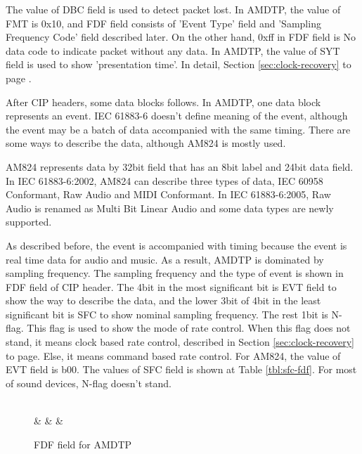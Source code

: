\documentclass[onecolumn]{article}
\begin{document}
The value of DBC field is used to detect packet lost. In AMDTP, the value of FMT is 0x10, and FDF field consists of 'Event Type' field and 'Sampling Frequency Code' field described later. On the other hand, 0xff in FDF field is No data code to indicate packet without any data. In AMDTP, the value of SYT field is used to show 'presentation time'. In detail, Section \ref{sec:clock-recovery} to page \pageref{sec:clock-recovery}.

After CIP headers, some data blocks follows. In AMDTP, one data block represents an event. IEC 61883-6\cite{iec61883-6-1, iec61883-6-2} doesn't define meaning of the event, although the event may be a batch of data accompanied with the same timing. There are some ways to describe the data, although AM824 is mostly used.

AM824 represents data by 32bit field that has an 8bit label and 24bit data field\cite{iec61883-6-2}. In IEC 61883-6:2002\cite{iec61883-6-1}, AM824 can describe three types of data, IEC 60958 Conformant, Raw Audio and MIDI Conformant. In IEC 61883-6:2005\cite{iec61883-6-2}, Raw Audio is renamed as Multi Bit Linear Audio and some data types are newly supported.

As described before, the event is accompanied with timing because the event is real time data for audio and music. As a result, AMDTP is dominated by sampling frequency. The sampling frequency and the type of event is shown in FDF field of CIP header. The 4bit in the most significant bit is EVT field to show the way to describe the data, and the lower 3bit of 4bit in the least significant bit is SFC to show nominal sampling frequency. The rest 1bit is N-flag. This flag is used to show the mode of rate control. When this flag does not stand, it means clock based rate control, described in Section \ref{sec:clock-recovery} to page\pageref{sec:clock-recovery}. Else, it means command based rate control\cite{iec61883-6-2, avc-rate-control}. For AM824, the value of EVT field is b00. The values of SFC field is shown at Table \ref{tbl:sfc-fdf}. For most of sound devices, N-flag doesn't stand.

\begin{figure}[H]
\centering
\begin{bytefield}[bitwidth=auto,endianness=big]{8}
	 \\
	 &
	 &
	 &
\end{bytefield}
\caption{FDF field for AMDTP}
\label{amdtp-fdf}
\end{figure}
\end{document}
